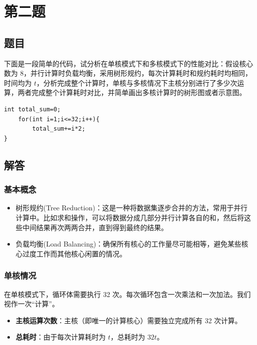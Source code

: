 \chapter{第二题}

\section{题目}

下面是一段简单的代码，试分析在单核模式下和多核模式下的性能对比：假设核心数为 8，并行计算时负载均衡，采用树形规约，每次计算耗时和规约耗时均相同，时间均为 $t$，分析完成整个计算时，单核与多核情况下主核分别进行了多少次运算，两者完成整个计算耗时对比，并简单画出多核计算时的树形图或者示意图。

\begin{lstlisting}[style=cleancpp]
int total_sum=0;
    for(int i=1;i<=32;i++){
        total_sum+=i*2;
}
\end{lstlisting}

\section{解答}

\subsection{基本概念}
\begin{itemize}
    \item 树形规约(Tree Reduction)：这是一种将数据集逐步合并的方法，常用于并行计算中。比如求和操作，可以将数据分成几部分并行计算各自的和，然后将这些中间结果再次两两合并，直到得到最终的结果。
    \item 负载均衡(Load Balancing)：确保所有核心的工作量尽可能相等，避免某些核心过度工作而其他核心闲置的情况。
\end{itemize}

\subsection{单核情况}
在单核模式下，循环体需要执行 32 次。每次循环包含一次乘法和一次加法。我们视作一次“计算”。
\begin{itemize}
    \item \textbf{主核运算次数}：主核（即唯一的计算核心）需要独立完成所有 32 次计算。
    \item \textbf{总耗时}：由于每次计算耗时为 $t$，总耗时为 $32t$。
\end{itemize}

